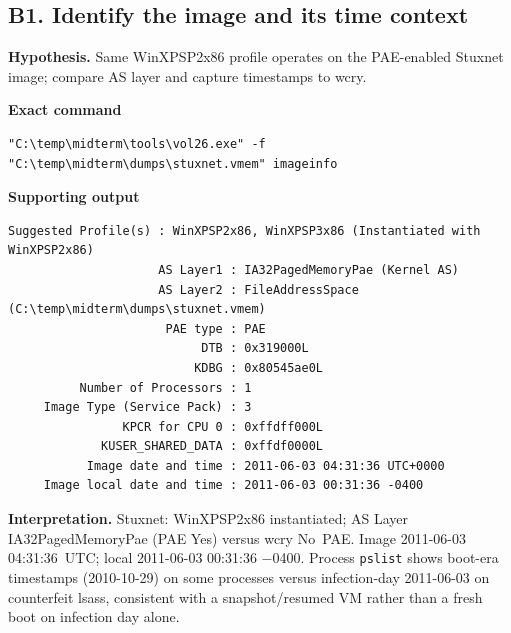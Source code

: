 \documentclass[11pt,letterpaper]{article}
\begin{document}
\subsection*{B1. Identify the image and its time context}
\textbf{Hypothesis.} Same WinXPSP2x86 profile operates on the PAE-enabled Stuxnet image; compare AS layer and capture timestamps to wcry.
\par\medskip\noindent\textbf{Exact command}
\begin{lstlisting}
"C:\temp\midterm\tools\vol26.exe" -f "C:\temp\midterm\dumps\stuxnet.vmem" imageinfo
\end{lstlisting}
\noindent\textbf{Supporting output}
\begin{lstlisting}
Suggested Profile(s) : WinXPSP2x86, WinXPSP3x86 (Instantiated with WinXPSP2x86)
                     AS Layer1 : IA32PagedMemoryPae (Kernel AS)
                     AS Layer2 : FileAddressSpace (C:\temp\midterm\dumps\stuxnet.vmem)
                      PAE type : PAE
                           DTB : 0x319000L
                          KDBG : 0x80545ae0L
          Number of Processors : 1
     Image Type (Service Pack) : 3
                KPCR for CPU 0 : 0xffdff000L
             KUSER_SHARED_DATA : 0xffdf0000L
           Image date and time : 2011-06-03 04:31:36 UTC+0000
     Image local date and time : 2011-06-03 00:31:36 -0400
\end{lstlisting}
\noindent\textbf{Interpretation.} Stuxnet: WinXPSP2x86 instantiated; AS Layer IA32PagedMemoryPae (PAE Yes) versus wcry No~PAE. Image 2011-06-03 04:31:36~UTC; local 2011-06-03 00:31:36 $-$0400. Process \texttt{pslist} shows boot-era timestamps (2010-10-29) on some processes versus infection-day 2011-06-03 on counterfeit lsass, consistent with a snapshot/resumed VM rather than a fresh boot on infection day alone.
\vspace{0.55em}
\end{document}
